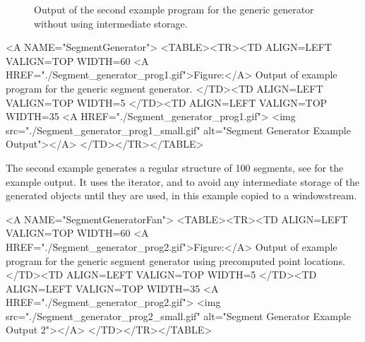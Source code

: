 \begin{ccTexOnly}
\begin{figure}
\begin{minipage}[t]{0.45\textwidth}
      \caption{Output of the second example program for the generic
        generator without using intermediate storage.}
      \label{figureSegmentGeneratorFan}
    \end{minipage}%
  \end{figure}
\end{ccTexOnly}


\begin{ccHtmlOnly}
  <A NAME="SegmentGenerator">
  <TABLE><TR><TD ALIGN=LEFT VALIGN=TOP WIDTH=60%
    <A HREF="./Segment_generator_prog1.gif">Figure:</A>
    Output of example program for the generic segment generator.
  </TD><TD ALIGN=LEFT VALIGN=TOP WIDTH=5%
  </TD><TD ALIGN=LEFT VALIGN=TOP WIDTH=35%
    <A HREF="./Segment_generator_prog1.gif">
        <img src="./Segment_generator_prog1_small.gif" 
             alt="Segment Generator Example Output"></A>
  </TD></TR></TABLE>
\end{ccHtmlOnly}

The second example generates a regular structure of 100 segments, see 
 for the example
output. It uses the  iterator,
 and  to
avoid any intermediate storage of the generated objects until they are
used, in this example copied to a windowstream.


\begin{ccHtmlOnly}
  <A NAME="SegmentGeneratorFan">
  <TABLE><TR><TD ALIGN=LEFT VALIGN=TOP WIDTH=60%
    <A HREF="./Segment_generator_prog2.gif">Figure:</A>
    Output of example program for the generic segment generator using
    precomputed point locations.
  </TD><TD ALIGN=LEFT VALIGN=TOP WIDTH=5%
  </TD><TD ALIGN=LEFT VALIGN=TOP WIDTH=35%
    <A HREF="./Segment_generator_prog2.gif">
        <img src="./Segment_generator_prog2_small.gif" 
             alt="Segment Generator Example Output 2"></A>
  </TD></TR></TABLE>
\end{ccHtmlOnly}


\ccParDims
\cgalColumnLayout
\beforecprogskip\parskip
{}




\ccParDims
\beforecprogskip\parskip
{}


